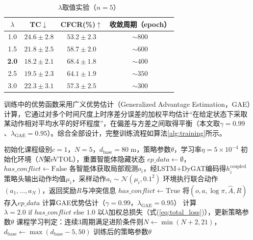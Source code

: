 \documentclass[12pt,a4paper,UTF8]{ctexart}
\begin{document}
\begin{table}[H]
    \centering
    \caption{$\lambda$取值实验（$n=5$）}
    \label{tab:lambda}
    \begin{tabular}{|c|c|c|c|}
        \hline
        $\lambda$ & TC$\downarrow$ & CFCR(\%)$\uparrow$ & 收敛周期（epoch） \\
        \hline
        1.0 & $24.6\pm2.8$ & $53.2\pm2.3$ & $\sim800$ \\
        1.5 & $21.8\pm2.5$ & $58.7\pm2.0$ & $\sim600$ \\
        \textbf{2.0} & $\mathbf{18.2\pm2.1}$ & $\mathbf{68.4\pm1.8}$ & $\sim400$ \\
        2.5 & $19.5\pm2.3$ & $64.1\pm1.9$ & $\sim350$ \\
        3.0 & $22.3\pm3.1$ & $57.3\pm2.5$ & $\sim300$ \\
        \hline
    \end{tabular}
\end{table}

训练中的优势函数采用广义优势估计（Generalized Advantage Estimation，GAE）\cite{ref38}计算，它通过对多个时间尺度上时序差分误差的加权平均估计“在给定状态下采取某动作相对平均水平的好坏程度”，在偏差与方差之间取得平衡（本文取$\gamma=0.99$、$\lambda_{\text{GAE}}=0.95$）。综合全部设计，完整训练流程如算法\ref{alg:training}所示。

\begin{algorithm}[H]
\caption{基于DyGAT-MARL的协同管控模型训练流程}
\label{alg:training}
\begin{algorithmic}[1]
\STATE 初始化课程级别$c=1$，$N=5$，$d_{\text{base}}=80$ m，策略参数$\theta$，学习率$\eta=5\times10^{-4}$
    \STATE 初始化环境（$N$架eVTOL），重置智能体隐藏状态
    \STATE $ep\_data \leftarrow \emptyset$，$has\_conflict \leftarrow \text{False}$
    \REPEAT
        \STATE 各智能体获取局部观测$o_i$，经LSTM+DyGAT编码得$h_i^{\text{coupled}}$
        \STATE 策略头输出动作均值$\mu_i$，采样动作$a_i\sim\mathcal{N}(\mu_i,0.1^2)$
        \STATE 环境执行联合动作$(a_1,\ldots,a_N)$，返回奖励$R$与冲突信息
         \STATE $has\_conflict \leftarrow \text{True}$ \ENDIF
        \STATE 将$(o,a,\log\pi,\hat{A},R)$存入$ep\_data$
    \STATE 计算GAE\cite{ref38}优势估计（$\gamma=0.99$，$\lambda_{\text{GAE}}=0.95$）
    \STATE 计算$\lambda = 2.0 \text{ if } has\_conflict \text{ else } 1.0$
    \STATE 以$\lambda$加权总损失（式(\ref{eq:total_loss})），更新策略参数$\theta$
    \STATE 课程学习判定：连续3周期满足进阶条件则$N\leftarrow\min(N+2,21)$，$d_{\text{base}}\leftarrow\max(d_{\text{base}}-5,50)$
\ENDFOR
\STATE \RETURN 训练后的策略参数$\theta$
\end{algorithmic}
\end{algorithm}
\end{document}
